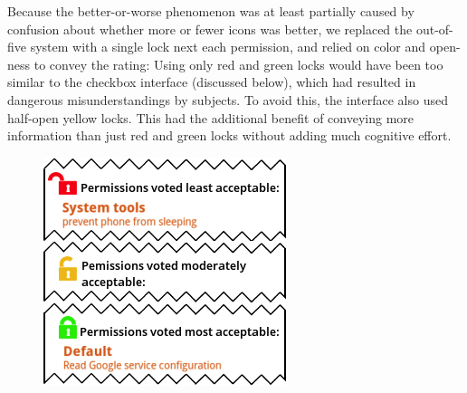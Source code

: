 \documentclass[11pt]{article}
\newcommand{\refsec}[1]{Section~\ref{#1}}
\begin{document}
Because the better-or-worse phenomenon was at least partially caused 
by confusion about whether more or fewer icons was better, we 
replaced the out-of-five system with 
a single lock next each permission, and relied on 
color and open-ness to convey the rating:
\label{ss-sec-locks-r3}
Using
only red and green locks would have been too similar to the checkbox
interface (discussed below),
which had resulted in dangerous misunderstandings by subjects. 
To avoid this, the interface also used half-open yellow 
locks. This 
had the additional benefit of conveying more 
information than just red and green locks without adding much cognitive 
effort.

\begin{figure}
\begin{center}
\includegraphics[width=.9\linewidth]{candidate-img/locks/locksR4.png}
\end{center}
\end{figure}
\end{document}
